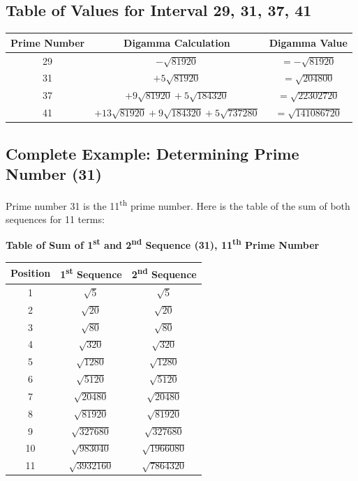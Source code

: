 \documentclass[a4paper,11pt]{article}
\begin{document}
\subsection{Table of Values for Interval 29, 31, 37, 41}

\begin{center}
\begin{tabular}{|c|c|c|}
\hline
\textbf{Prime Number} & \textbf{Digamma Calculation} & \textbf{Digamma Value} \\
\hline
29 & $-\sqrt{81920}$ & $= -\sqrt{81920}$ \\
\hline
31 & $+5\sqrt{81920}$ & $= \sqrt{204800}$ \\
\hline
37 & $+9\sqrt{81920} + 5\sqrt{184320}$ & $= \sqrt{22302720}$ \\
\hline
41 & $+13\sqrt{81920} + 9\sqrt{184320} + 5\sqrt{737280}$ & $= \sqrt{141086720}$ \\
\hline
\end{tabular}
\end{center}

\subsection{Complete Example: Determining Prime Number (31)}

Prime number 31 is the 11\textsuperscript{th} prime number. Here is the table of the sum of both sequences for 11 terms:

\begin{center}
\textbf{Table of Sum of 1\textsuperscript{st} and 2\textsuperscript{nd} Sequence (31), 11\textsuperscript{th} Prime Number}
\end{center}

\begin{center}
\small
\begin{tabular}{|c|c|c|}
\hline
\textbf{Position} & \textbf{1\textsuperscript{st} Sequence} & \textbf{2\textsuperscript{nd} Sequence} \\
\hline
1 & $\sqrt{5}$ & $\sqrt{5}$ \\
\hline
2 & $\sqrt{20}$ & $\sqrt{20}$ \\
\hline
3 & $\sqrt{80}$ & $\sqrt{80}$ \\
\hline
4 & $\sqrt{320}$ & $\sqrt{320}$ \\
\hline
5 & $\sqrt{1280}$ & $\sqrt{1280}$ \\
\hline
6 & $\sqrt{5120}$ & $\sqrt{5120}$ \\
\hline
7 & $\sqrt{20480}$ & $\sqrt{20480}$ \\
\hline
8 & $\sqrt{81920}$ & $\sqrt{81920}$ \\
\hline
9 & $\sqrt{327680}$ & $\sqrt{327680}$ \\
\hline
10 & $\sqrt{983040}$ & $\sqrt{1966080}$ \\
\hline
11 & $\sqrt{3932160}$ & $\sqrt{7864320}$ \\
\hline
\end{tabular}
\end{center}
\end{document}
